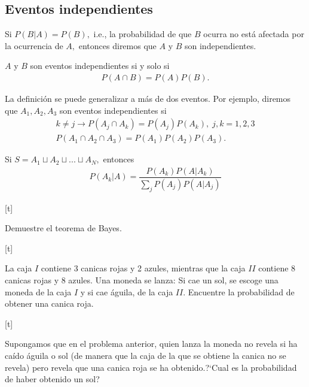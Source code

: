 \subsection{Eventos independientes}
{}
Si $P(B|A)=P(B),$ i.e., la probabilidad de que $B$ ocurra no está afectada por la ocurrencia de $A,$ entonces diremos que $A$ y $B$ son independientes.


\begin{defn}
 $A$ y $B$ son eventos independientes si y solo si
 \begin{align}
  \label{1.21}
  P(A \cap B) = P(A)P(B).
 \end{align}
\end{defn}


{}
La definición se puede generalizar a más de dos eventos.  Por ejemplo, diremos que $A_{1},A_{2},A_{3}$ son eventos independientes si
\begin{align}
k\neq j \rightarrow P(A_{j} \cap A_{k})=P(A_{j})P(A_{k}), \; j,k=1,2,3 
\\ P(A_{1}\cap A_{2} \cap A_{3})=P(A_{1})P(A_{2})P(A_{3}).
\end{align}


{}
\begin{thm}
 Si $S=A_{1}\sqcup A_{2} \sqcup...\sqcup A_{N},$ entonces
 \begin{align}
  \label{1.24}
  P(A_{k}|A) = \dfrac{P(A_{k})P(A|A_{k})}{\sum_{j} P(A_{j})P(A|A_{j})}
 \end{align}

\end{thm}



[t]
 \begin{exmp}
  \label{solved:1.16}
  Demuestre el teorema de Bayes.
 \end{exmp}



[t]{}
 \begin{exmp}
  \label{solved:1.15}
 La caja $I$ contiene 3 canicas rojas y 2 azules, mientras que la caja $II$ contiene $8$ canicas rojas y 8 azules. Una moneda se lanza: Si cae un sol, se escoge una moneda de la caja $I$ y si cae águila, de la caja $II.$ Encuentre la probabilidad de obtener una canica roja.
 \end{exmp}


[t]{}
 \begin{exmp}
  \label{solved:17}
	Supongamos que en el problema anterior, quien lanza la moneda no revela si ha caído águila o sol (de manera que la caja de la que se obtiene la canica no se revela) pero revela que una canica roja se ha obtenido.?`Cual es la probabilidad de haber obtenido un sol?
 \end{exmp}



